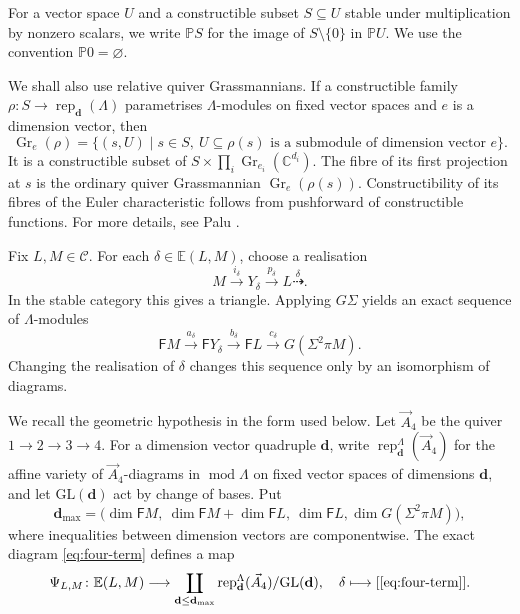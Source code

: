 \documentclass[11pt,reqno]{article}
\numberwithin{equation}{section}
\theoremstyle{definition}
\DeclareMathOperator{\Gr}{Gr}
\DeclareMathOperator{\modu}{mod}
\newcommand{\C}{\mathcal C}
\newcommand{\E}{\mathbb E}
\newcommand{\F}{\mathsf F}
\newcommand{\kk}{\mathbb C}
\newcommand{\xto}[1]{\xrightarrow{#1}}
\newcommand{\etri}{\dashrightarrow}
\begin{document}
For a vector space $U$ and a constructible subset $S\subseteq U$ stable under multiplication by nonzero scalars, we write $\mathbb PS$ for the image of $S\setminus\{0\}$ in $\mathbb PU$.  We use the convention $\mathbb P0=\varnothing$.

We shall also use relative quiver Grassmannians.  If a constructible family
$\rho\colon S\to\operatorname{rep}_{\mathbf d}(\Lambda)$ parametrises
$\Lambda$-modules on fixed vector spaces and $e$ is a dimension vector, then
\[
 \Gr_e(\rho)=\{(s,U)\mid s\in S,\ U\subseteq\rho(s)
                   \text{ is a submodule of dimension vector }e\}.
\]
It is a constructible subset of $S\times\prod_i\Gr_{e_i}(\kk^{d_i})$.
The fibre of its first projection at $s$ is the ordinary quiver Grassmannian
$\Gr_e(\rho(s))$.  Constructibility of its fibres of the Euler characteristic follows
from pushforward of constructible functions. For more details, see Palu \cite[Proposition~2.1 and
Lemma~2.4]{Palu2012}.



Fix $L,M\in\C$.  For each $\delta\in\E(L,M)$, choose a realisation
\begin{equation}\label{eq:realisation}
 M\xto{i_\delta}Y_\delta\xto{p_\delta}L
 \overset{\delta}{\etri}.
\end{equation}
In the stable category this gives a triangle.  Applying $G\Sigma$ yields an exact sequence of $\Lambda$-modules
\begin{equation}\label{eq:four-term}
 \F M\xto{a_\delta}\F Y_\delta\xto{b_\delta}\F L
 \xto{c_\delta}G(\Sigma^2\pi M).
\end{equation}
Changing the realisation of $\delta$ changes this sequence only by an isomorphism of diagrams.

We recall the geometric hypothesis in the form used below.  Let
$\vec A_4$ be the quiver $1\to2\to3\to4$.  For a dimension vector
quadruple $\mathbf d$, write
$\operatorname{rep}^{\Lambda}_{\mathbf d}(\vec A_4)$ for the affine variety of
$\vec A_4$-diagrams in $\modu\Lambda$ on fixed vector spaces of dimensions
$\mathbf d$, and let $\mathrm{GL}(\mathbf d)$ act by change of bases.  Put
\[
 \mathbf d_{\max}=
 \bigl(\dim\F M,\ \dim\F M+\dim\F L,\ \dim\F L,
       \dim G(\Sigma^2\pi M)\bigr),
\]
where inequalities between dimension vectors are componentwise.  The exact
diagram \eqref{eq:four-term} defines a map
\begin{equation}\label{eq:orbit-map}
 \Psi_{L,M}\colon\E(L,M)\longrightarrow
 \coprod_{\mathbf d\leq\mathbf d_{\max}}
 \operatorname{rep}^{\Lambda}_{\mathbf d}(\vec A_4)/
 \mathrm{GL}(\mathbf d),
 \quad
 \delta\longmapsto[\eqref{eq:four-term}].
\end{equation}
\end{document}
